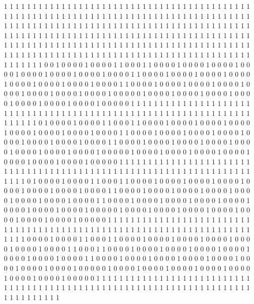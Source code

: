 1 1 1 1 1 1 1 1 1 1 1 1 1 1 1 1 1 1 1 1
1 1 1 1 1 1 1 1 1 1 1 1 1 1 1 1 1 1 1 1
1 1 1 1 1 1 1 1 1 1 1 1 1 1 1 1 1 1 1 1
1 1 1 1 1 1 1 1 1 1 1 1 1 1 1 1 1 1 1 1
1 1 1 1 1 1 1 1 1 1 1 1 1 1 1 1 1 1 1 1
1 1 1 1 1 1 1 1 1 1 1 1 1 1 1 1 1 1 1 1
1 1 1 1 1 1 1 1 1 1 1 1 1 1 1 1 1 1 1 1
1 1 1 1 1 1 1 1 1 1 1 1 1 1 1 1 1 1 1 1
1 1 1 1 1 1 1 1 1 1 1 1 1 1 1 1 1 1 1 1
1 1 1 1 1 1 1 1 1 1 1 1 1 1 1 1 1 1 1 1
1 1 1 1 1 1 1 1 1 1 1 1 1 1 1 1 1 1 1 1
1 1 1 1 1 1 1 1 1 1 1 1 1 1 1 1 1 1 1 1
1 1 1 1 1 1 1 1 1 1 1 1 1 1 1 1 1 1 1 1
1 1 1 1 1 0 0 1 0 0 0 0 1 0 0 0 0 1 1 0
0 0 1 1 0 0 0 0 1 0 0 0 0 1 0 0 0 0 1 0
0 0 0 1 0 0 0 0 1 0 0 0 0 1 0 0 0 0 1 0
0 0 0 1 1 0 0 0 0 1 0 0 0 0 1 0 0 0 0 1
0 0 0 0 1 0 0 0 0 1 0 0 0 0 1 0 0 0 0 1
0 0 0 0 1 1 0 0 0 0 1 0 0 0 0 1 0 0 0 0
1 0 0 0 0 1 0 0 0 0 1 0 0 0 0 1 0 0 0 0
1 0 0 0 0 1 0 0 0 0 0 1 0 0 0 0 1 0 0 0
0 1 0 0 0 0 1 0 0 0 0 1 0 0 0 0 1 0 0 0
0 1 0 0 0 0 1 0 0 0 0 0 1 1 1 1 1 1 1 1
1 1 1 1 1 1 1 1 1 1 1 1 1 1 1 1 1 1 1 1
1 1 1 1 1 1 1 1 1 1 1 1 1 1 1 1 1 1 1 1
1 1 1 1 1 1 1 1 1 1 1 1 1 1 1 1 1 1 1 1
1 1 0 1 0 0 0 0 1 0 0 0 0 1 1 0 0 0 1 1
0 0 0 0 1 0 0 0 0 1 0 0 0 0 1 0 0 0 0 1
0 0 0 0 1 0 0 0 0 1 0 0 0 0 1 0 0 0 0 1
1 0 0 0 0 1 0 0 0 0 1 0 0 0 0 1 0 0 0 0
1 0 0 0 0 1 0 0 0 0 1 0 0 0 0 1 0 0 0 0
1 1 0 0 0 0 1 0 0 0 0 1 0 0 0 0 1 0 0 0
0 1 0 0 0 0 1 0 0 0 0 1 0 0 0 0 1 0 0 0
0 1 0 0 0 0 0 1 0 0 0 0 1 0 0 0 0 1 0 0
0 0 1 0 0 0 0 1 0 0 0 0 1 0 0 0 0 1 0 0
0 0 1 0 0 0 0 0 1 1 1 1 1 1 1 1 1 1 1 1
1 1 1 1 1 1 1 1 1 1 1 1 1 1 1 1 1 1 1 1
1 1 1 1 1 1 1 1 1 1 1 1 1 1 1 1 1 1 1 1
1 1 1 1 1 1 1 1 1 1 1 1 1 1 1 1 1 1 0 1
0 0 0 0 1 0 0 0 0 1 1 0 0 0 1 1 0 0 0 0
1 0 0 0 0 1 0 0 0 0 1 0 0 0 0 1 0 0 0 0
1 0 0 0 0 1 0 0 0 0 1 0 0 0 0 1 1 0 0 0
0 1 0 0 0 0 1 0 0 0 0 1 0 0 0 0 1 0 0 0
0 1 0 0 0 0 1 0 0 0 0 1 0 0 0 0 1 1 0 0
0 0 1 0 0 0 0 1 0 0 0 0 1 0 0 0 0 1 0 0
0 0 1 0 0 0 0 1 0 0 0 0 1 0 0 0 0 1 0 0
0 0 0 1 0 0 0 0 1 0 0 0 0 1 0 0 0 0 1 0
0 0 0 1 0 0 0 0 1 0 0 0 0 1 0 0 0 0 1 0
0 0 0 0 1 1 1 1 1 1 1 1 1 1 1 1 1 1 1 1
1 1 1 1 1 1 1 1 1 1 1 1 1 1 1 1 1 1 1 1
1 1 1 1 1 1 1 1 1 1 1 1 1 1 1 1 1 1 1 1
1 1 1 1 1 1 1 1 1 1 1 1 1 1 1 1 0 0 0 0
1 0 0 0 0 1 1 0 0 0 1 1 0 0 0 0 1 0 0 0
0 1 0 0 0 0 1 0 0 0 0 1 0 0 0 0 1 0 0 0
0 1 0 0 0 0 1 1 0 0 0 1 1 0 0 0 0 1 0 0
0 0 1 0 0 0 0 1 0 0 0 0 1 0 0 0 0 1 0 0
0 0 1 0 0 0 0 1 0 0 0 0 1 1 0 0 0 0 1 0
0 0 0 1 0 0 0 0 1 0 0 0 0 1 0 0 0 0 1 0
0 0 0 1 0 0 0 0 1 0 0 0 0 1 0 0 0 0 0 1
0 0 0 0 1 0 0 0 0 1 0 0 0 0 1 0 0 0 0 1
0 0 0 0 1 0 0 0 0 1 0 0 0 0 1 0 0 0 0 0
1 1 1 1 1 1 1 1 1 1 1 1 1 1 1 1 1 1 1 1
1 1 1 1 1 1 1 1 1 1 1 1 1 1 1 1 1 1 1 1
1 1 1 1 1 1 1 1 1 1 1 1 1 1 1 1 1 1 1 1
1 1 1 1 1 1 1 1 1 1 1 1 1 1 1 1 1 1 1 1
